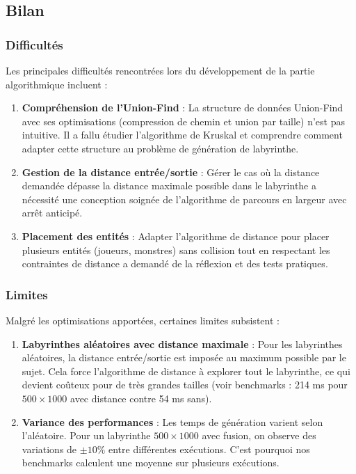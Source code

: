 \documentclass{butexFR}
\begin{document}
\newpage

\subsection{Bilan}

\subsubsection{Difficultés}

Les principales difficultés rencontrées lors du développement de la partie algorithmique incluent :

\begin{enumerate}
    \item \textbf{Compréhension de l'Union-Find} : La structure de données Union-Find avec ses optimisations (compression de chemin et union par taille) n'est pas intuitive. Il a fallu étudier l'algorithme de Kruskal et comprendre comment adapter cette structure au problème de génération de labyrinthe.

    \item \textbf{Gestion de la distance entrée/sortie} : Gérer le cas où la distance demandée dépasse la distance maximale possible dans le labyrinthe a nécessité une conception soignée de l'algorithme de parcours en largeur avec arrêt anticipé.

    \item \textbf{Placement des entités} : Adapter l'algorithme de distance pour placer plusieurs entités (joueurs, monstres) sans collision tout en respectant les contraintes de distance a demandé de la réflexion et des tests pratiques.
\end{enumerate}

\subsubsection{Limites}

Malgré les optimisations apportées, certaines limites subsistent :

\begin{enumerate}
    \item \textbf{Labyrinthes aléatoires avec distance maximale} : Pour les labyrinthes aléatoires, la distance entrée/sortie est imposée au maximum possible par le sujet. Cela force l'algorithme de distance à explorer tout le labyrinthe, ce qui devient coûteux pour de très grandes tailles (voir benchmarks : 214 ms pour $500 \times 1000$ avec distance contre 54 ms sans).

    \item \textbf{Variance des performances} : Les temps de génération varient selon l'aléatoire. Pour un labyrinthe $500 \times 1000$ avec fusion, on observe des variations de $\pm 10\%$ entre différentes exécutions. C'est pourquoi nos benchmarks calculent une moyenne sur plusieurs exécutions.
\end{enumerate}
\end{document}
